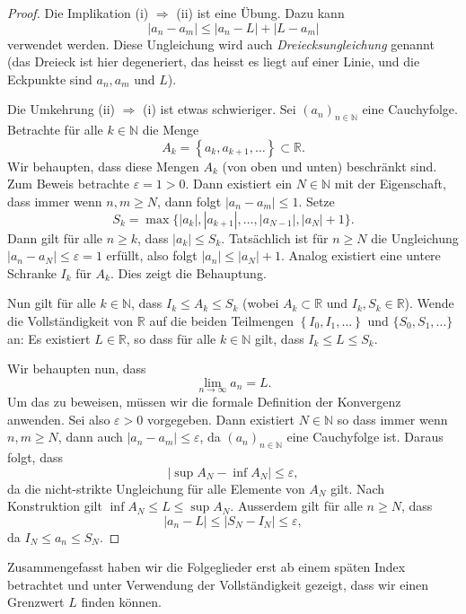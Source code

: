 \documentclass[../main.tex]{subfiles}
\begin{document}
\begin{proof}
  Die Implikation (i) $\Rightarrow$ (ii) ist eine Übung.
  Dazu kann  
  \[
    |a_n - a_m| \leq |a_n - L| + |L - a_m|
  \]
  verwendet werden. Diese Ungleichung wird auch
  \emph{Dreiecksungleichung} genannt (das Dreieck
  ist hier degeneriert, das heisst es liegt
  auf einer Linie, und die Eckpunkte sind
  $a_n, a_m$ und $L$).

  Die Umkehrung (ii) $\Rightarrow$ (i) ist etwas schwieriger.
Sei ${\left( a_n \right)}_{n \in \mathbb{N}}$ eine
  Cauchyfolge.
  Betrachte für alle $k \in \mathbb{N}$ die Menge
  \[
    A_k = \left\{ a_{k}, a_{k+1}, \dots \right\}
    \subset \mathbb{R}.
  \]
  Wir behaupten, dass diese Mengen $A_k$
  (von oben und unten)
  beschränkt sind.
  Zum Beweis betrachte $\varepsilon = 1 > 0$.
  Dann existiert ein $N \in \mathbb{N}$ mit
  der Eigenschaft, dass immer wenn
  $n, m \geq N$, dann folgt
  $|a_n - a_m| \leq 1$.
  Setze
  \[
  S_k = \max \{|a_k|, |a_{k+1}|, \dots, |a_{N-1}|, |a_N| + 1\}.
  \]
  Dann gilt für alle $n \geq k$, dass $|a_k| \leq S_k$.
  Tatsächlich ist für $n \geq N$ die Ungleichung
  $|a_n - a_N| \leq \varepsilon = 1$
  erfüllt, also folgt $|a_n| \leq |a_N| + 1$.
  Analog existiert eine untere Schranke $I_k$ für 
  $A_k$.
  Dies zeigt die Behauptung.

  Nun gilt für alle $k \in \mathbb{N}$, dass
  $I_k \leq A_k \leq S_k$ (wobei $A_k \subset \mathbb{R}$
  und $I_k, S_k \in \mathbb{R}$).
  Wende die Vollständigkeit von $\mathbb{R}$ 
  auf die beiden Teilmengen
  $\left\{ I_0, I_1, \dots \right\} $
  und $\{S_0, S_1, \dots\}$ an: Es existiert
  $L \in \mathbb{R}$, so dass für alle
  $k \in \mathbb{N}$ gilt, dass $I_k \leq L \leq S_k$.

  Wir behaupten nun, dass
  \[
    \lim_{n \to \infty} a_n = L.
  \]
  Um das zu beweisen, müssen wir die formale
  Definition der Konvergenz anwenden.
  Sei also $\varepsilon > 0$ vorgegeben.
  Dann existiert $N \in \mathbb{N}$ 
  so dass immer wenn $n, m \geq N$, dann auch
  $|a_n - a_m| \leq \varepsilon$,
  da ${(a_n)}_{n \in \mathbb{N}}$ eine Cauchyfolge ist.
  Daraus folgt, dass
  \[
    |\sup A_N - \inf A_N| \leq \varepsilon,
  \]
  da die nicht-strikte Ungleichung für alle
  Elemente von $A_N$ gilt.
  Nach Konstruktion gilt $\inf A_N \leq L \leq \sup A_N$.
  Ausserdem gilt für alle $n \geq N$, dass
  \[
    |a_n - L| \leq |S_N - I_N| \leq \varepsilon,
  \]
  da $I_N \leq a_n \leq S_N$.
\end{proof}

Zusammengefasst haben wir die Folgeglieder
erst ab einem späten Index betrachtet und
unter Verwendung der Vollständigkeit
gezeigt, dass wir einen Grenzwert $L$
finden können.
\end{document}
